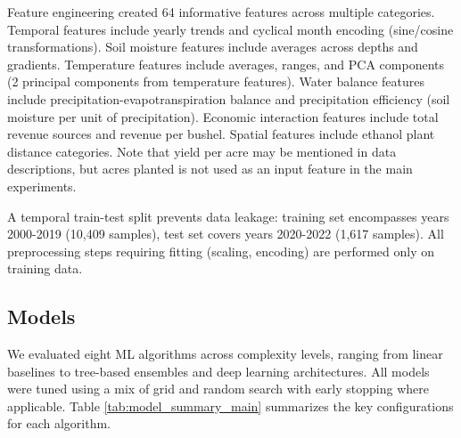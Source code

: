 \documentclass[twocolumn]{article}
\begin{document}
Feature engineering created 64 informative features across multiple categories. Temporal features include yearly trends and cyclical month encoding (sine/cosine transformations). Soil moisture features include averages across depths and gradients. Temperature features include averages, ranges, and PCA components (2 principal components from temperature features). Water balance features include precipitation-evapotranspiration balance and precipitation efficiency (soil moisture per unit of precipitation). Economic interaction features include total revenue sources and revenue per bushel. Spatial features include ethanol plant distance categories. Note that yield per acre may be mentioned in data descriptions, but acres planted is not used as an input feature in the main experiments.

A temporal train-test split prevents data leakage: training set encompasses years 2000-2019 (10,409 samples), test set covers years 2020-2022 (1,617 samples). All preprocessing steps requiring fitting (scaling, encoding) are performed only on training data.

\subsection{Models}
We evaluated eight ML algorithms across complexity levels, ranging from linear baselines to tree-based ensembles and deep learning architectures. All models were tuned using a mix of grid and random search with early stopping where applicable. Table \ref{tab:model_summary_main} summarizes the key configurations for each algorithm.

\begin{table}[htb]
\centering
\caption{Overview of Key Model Configurations}
\label{tab:model_summary_main}
\end{table}
\end{document}
